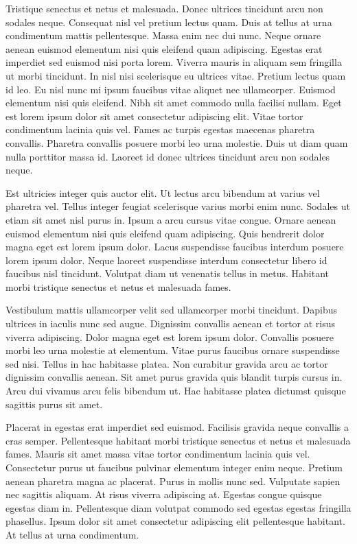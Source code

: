 \documentclass[11pt,a4paper]{article}
\begin{document}
Tristique senectus et netus et malesuada. Donec ultrices tincidunt arcu non sodales neque. Consequat nisl vel pretium lectus quam. Duis at tellus at urna condimentum mattis pellentesque. Massa enim nec dui nunc. Neque ornare aenean euismod elementum nisi quis eleifend quam adipiscing. Egestas erat imperdiet sed euismod nisi porta lorem. Viverra mauris in aliquam sem fringilla ut morbi tincidunt. In nisl nisi scelerisque eu ultrices vitae. Pretium lectus quam id leo. Eu nisl nunc mi ipsum faucibus vitae aliquet nec ullamcorper. Euismod elementum nisi quis eleifend. Nibh sit amet commodo nulla facilisi nullam. Eget est lorem ipsum dolor sit amet consectetur adipiscing elit. Vitae tortor condimentum lacinia quis vel. Fames ac turpis egestas maecenas pharetra convallis. Pharetra convallis posuere morbi leo urna molestie. Duis ut diam quam nulla porttitor massa id. Laoreet id donec ultrices tincidunt arcu non sodales neque.

Est ultricies integer quis auctor elit. Ut lectus arcu bibendum at varius vel pharetra vel. Tellus integer feugiat scelerisque varius morbi enim nunc. Sodales ut etiam sit amet nisl purus in. Ipsum a arcu cursus vitae congue. Ornare aenean euismod elementum nisi quis eleifend quam adipiscing. Quis hendrerit dolor magna eget est lorem ipsum dolor. Lacus suspendisse faucibus interdum posuere lorem ipsum dolor. Neque laoreet suspendisse interdum consectetur libero id faucibus nisl tincidunt. Volutpat diam ut venenatis tellus in metus. Habitant morbi tristique senectus et netus et malesuada fames.

Vestibulum mattis ullamcorper velit sed ullamcorper morbi tincidunt. Dapibus ultrices in iaculis nunc sed augue. Dignissim convallis aenean et tortor at risus viverra adipiscing. Dolor magna eget est lorem ipsum dolor. Convallis posuere morbi leo urna molestie at elementum. Vitae purus faucibus ornare suspendisse sed nisi. Tellus in hac habitasse platea. Non curabitur gravida arcu ac tortor dignissim convallis aenean. Sit amet purus gravida quis blandit turpis cursus in. Arcu dui vivamus arcu felis bibendum ut. Hac habitasse platea dictumst quisque sagittis purus sit amet.

Placerat in egestas erat imperdiet sed euismod. Facilisis gravida neque convallis a cras semper. Pellentesque habitant morbi tristique senectus et netus et malesuada fames. Mauris sit amet massa vitae tortor condimentum lacinia quis vel. Consectetur purus ut faucibus pulvinar elementum integer enim neque. Pretium aenean pharetra magna ac placerat. Purus in mollis nunc sed. Vulputate sapien nec sagittis aliquam. At risus viverra adipiscing at. Egestas congue quisque egestas diam in. Pellentesque diam volutpat commodo sed egestas egestas fringilla phasellus. Ipsum dolor sit amet consectetur adipiscing elit pellentesque habitant. At tellus at urna condimentum.
\end{document}
